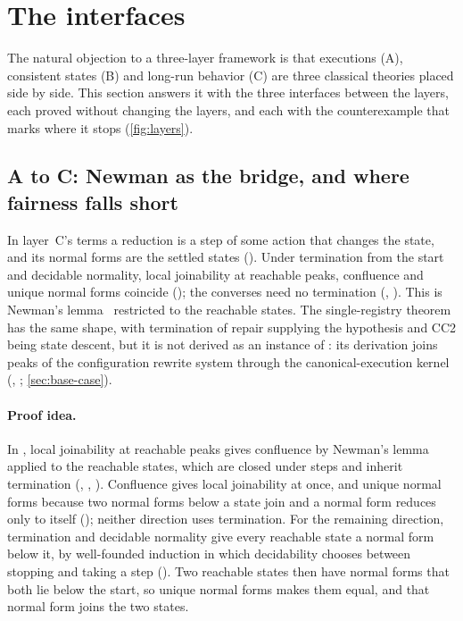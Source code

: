 
\section{The interfaces}\label{sec:interfaces}

The natural objection to a three-layer framework is that executions (A), consistent states (B) and
long-run behavior (C) are three classical theories placed side by side. This section answers it with
the three interfaces between the layers, each proved without changing the layers, and each with the
counterexample that marks where it stops (\cref{fig:layers}).

\subsection{A to C: Newman as the bridge, and where fairness falls short}

In layer~C's terms a reduction is a step of some action that changes the state, and its normal forms
are the settled states (). Under termination from the start and decidable
normality, local joinability at reachable peaks, confluence and unique normal forms coincide
(); the converses need no termination (, ). This is
Newman's lemma~\cite{newman1942} restricted to the reachable states. The single-registry theorem has the same
shape, with termination of repair supplying the hypothesis and CC2 being state descent, but it is not
derived as an instance of : its derivation joins peaks of the configuration rewrite
system through the canonical-execution kernel (, ;
\cref{sec:base-case}).

\paragraph{Proof idea.}
In , local joinability at reachable peaks gives confluence by Newman's lemma
applied to the reachable states, which are closed under steps and inherit termination
(, , ). Confluence gives local joinability at
once, and unique normal forms because two normal forms below a state join and a normal form reduces
only to itself (); neither direction uses termination. For the
remaining direction, termination and decidable normality give every reachable state a normal form
below it, by well-founded induction in which decidability chooses between stopping and taking a step
(). Two reachable states then have normal forms that both lie below the start, so
unique normal forms makes them equal, and that normal form joins the two states.

